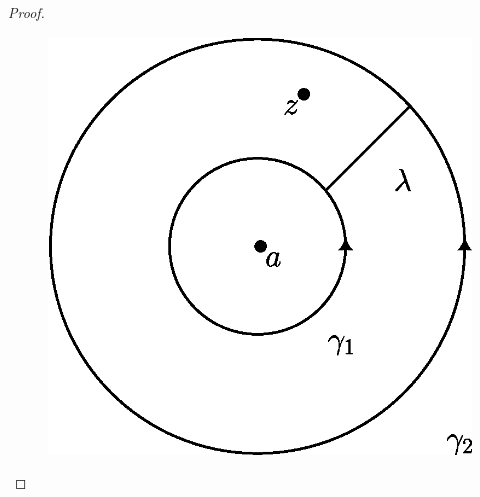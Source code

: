 \begin{proof}
    \begin{figure}[h]
        \centering
        \includegraphics[scale=0.5]{Figures/chapter5/laurent_series.eps}
        \caption{}
        \label{figure_5.2}
    \end{figure}


\end{proof}
